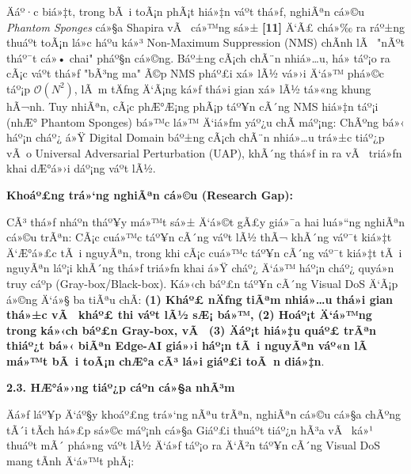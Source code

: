 \documentclass[]{article}
\begin{document}
Äáº·c biá»‡t, trong bÃ i toÃ¡n phÃ¡t hiá»‡n váº­t thá»ƒ, nghiÃªn cá»©u \emph{Phantom
Sponges} cá»§a Shapira vÃ  cá»™ng sá»± \textbf{{[}11{]}} Ä‘Ã£ chá»‰ ra ráº±ng thuáº­t
toÃ¡n lá»c háº­u ká»³ Non-Maximum Suppression (NMS) chÃ­nh lÃ  "nÃºt tháº¯t
cá»• chai" pháº§n cá»©ng. Báº±ng cÃ¡ch chÃ¨n nhiá»…u, há» táº¡o ra cÃ¡c váº­t thá»ƒ "bÃ³ng
ma" Ã©p NMS pháº£i xá»­ lÃ½ vá»›i Ä‘á»™ phá»©c táº¡p
\(\mathcal{O}\left( N^{2} \right)\), lÃ m tÄƒng Ä‘Ã¡ng ká»ƒ thá»i gian xá»­ lÃ½
tá»«ng khung hÃ¬nh. Tuy nhiÃªn, cÃ¡c phÆ°Æ¡ng phÃ¡p táº¥n cÃ´ng NMS hiá»‡n táº¡i (nhÆ°
Phantom Sponges) bá»™c lá»™ Ä‘iá»ƒm yáº¿u chÃ­ máº¡ng: ChÃºng bá»‹ háº¡n cháº¿ á»Ÿ Digital 
Domain báº±ng cÃ¡ch chÃ¨n nhiá»…u trá»±c tiáº¿p vÃ o Universal Adversarial 
Perturbation (UAP), khÃ´ng thá»ƒ in ra vÃ  triá»ƒn khai dÆ°á»›i dáº¡ng váº­t lÃ½.

\textbf{Khoáº£ng trá»‘ng nghiÃªn cá»©u (Research Gap):}

CÃ³ thá»ƒ nháº­n tháº¥y má»™t sá»± Ä‘á»©t gÃ£y giá»¯a hai luá»“ng nghiÃªn cá»©u trÃªn: CÃ¡c cuá»™c
táº¥n cÃ´ng váº­t lÃ½ thÃ¬ khÃ´ng váº¯t kiá»‡t Ä‘Æ°á»£c tÃ i nguyÃªn, trong khi cÃ¡c cuá»™c
táº¥n cÃ´ng váº¯t kiá»‡t tÃ i nguyÃªn láº¡i khÃ´ng thá»ƒ triá»ƒn khai á»Ÿ cháº¿ Ä‘á»™ háº¡n cháº¿
quyá»n truy cáº­p (Gray-box/Black-box). Ká»‹ch báº£n táº¥n cÃ´ng Visual DoS Ä‘Ã¡p á»©ng 
Ä‘á»§ ba tiÃªu chÃ­: \textbf{(1) Kháº£ nÄƒng tiÃªm nhiá»…u thá»i gian thá»±c vÃ  kháº£ thi 
váº­t lÃ½ sÆ¡ bá»™, (2) Hoáº¡t Ä‘á»™ng trong ká»‹ch báº£n Gray-box, vÃ  (3) Äáº¡t hiá»‡u quáº£ 
trÃªn thiáº¿t bá»‹ biÃªn Edge-AI giá»›i háº¡n tÃ i nguyÃªn váº«n lÃ  má»™t bÃ i toÃ¡n chÆ°a cÃ³ 
lá»i giáº£i toÃ n diá»‡n}.

\textbf{2.3. HÆ°á»›ng tiáº¿p cáº­n cá»§a nhÃ³m}

Äá»ƒ láº¥p Ä‘áº§y khoáº£ng trá»‘ng nÃªu trÃªn, nghiÃªn cá»©u cá»§a chÃºng tÃ´i tÃ­ch há»£p sá»©c
máº¡nh cá»§a Giáº£i thuáº­t tiáº¿n hÃ³a vÃ  ká»¹ thuáº­t mÃ´ phá»ng váº­t lÃ½ Ä‘á»ƒ táº¡o ra Ä‘Ã²n
táº¥n cÃ´ng Visual DoS mang tÃ­nh Ä‘á»™t phÃ¡:
\end{document}
